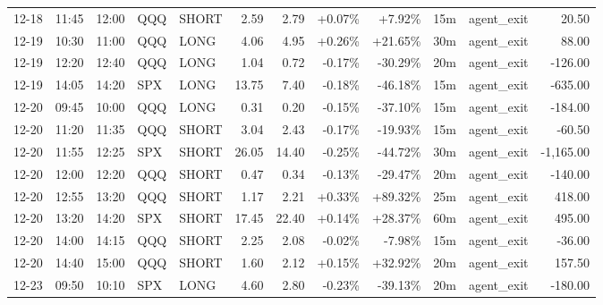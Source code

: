 \documentclass[11pt,a4paper]{article}
\begin{document}
\begin{center}
\begin{longtable}{>{\color{txtmain}}l l l l l r r r r r >{\color{txtmain}}l r}
12-18 & 11:45 & 12:00 & QQQ & SHORT & 2.59 & 2.79 & \textcolor{wingreen}{+0.07\%} & \textcolor{wingreen}{+7.92\%} & 15m & agent\_exit & \textcolor{wingreen}{20.50} \\
12-19 & 10:30 & 11:00 & QQQ & LONG & 4.06 & 4.95 & \textcolor{wingreen}{+0.26\%} & \textcolor{wingreen}{+21.65\%} & 30m & agent\_exit & \textcolor{wingreen}{88.00} \\
12-19 & 12:20 & 12:40 & QQQ & LONG & 1.04 & 0.72 & \textcolor{lossred}{-0.17\%} & \textcolor{lossred}{-30.29\%} & 20m & agent\_exit & \textcolor{lossred}{-126.00} \\
12-19 & 14:05 & 14:20 & SPX & LONG & 13.75 & 7.40 & \textcolor{lossred}{-0.18\%} & \textcolor{lossred}{-46.18\%} & 15m & agent\_exit & \textcolor{lossred}{-635.00} \\
12-20 & 09:45 & 10:00 & QQQ & LONG & 0.31 & 0.20 & \textcolor{lossred}{-0.15\%} & \textcolor{lossred}{-37.10\%} & 15m & agent\_exit & \textcolor{lossred}{-184.00} \\
12-20 & 11:20 & 11:35 & QQQ & SHORT & 3.04 & 2.43 & \textcolor{lossred}{-0.17\%} & \textcolor{lossred}{-19.93\%} & 15m & agent\_exit & \textcolor{lossred}{-60.50} \\
12-20 & 11:55 & 12:25 & SPX & SHORT & 26.05 & 14.40 & \textcolor{lossred}{-0.25\%} & \textcolor{lossred}{-44.72\%} & 30m & agent\_exit & \textcolor{lossred}{-1,165.00} \\
12-20 & 12:00 & 12:20 & QQQ & SHORT & 0.47 & 0.34 & \textcolor{lossred}{-0.13\%} & \textcolor{lossred}{-29.47\%} & 20m & agent\_exit & \textcolor{lossred}{-140.00} \\
12-20 & 12:55 & 13:20 & QQQ & SHORT & 1.17 & 2.21 & \textcolor{wingreen}{+0.33\%} & \textcolor{wingreen}{+89.32\%} & 25m & agent\_exit & \textcolor{wingreen}{418.00} \\
12-20 & 13:20 & 14:20 & SPX & SHORT & 17.45 & 22.40 & \textcolor{wingreen}{+0.14\%} & \textcolor{wingreen}{+28.37\%} & 60m & agent\_exit & \textcolor{wingreen}{495.00} \\
12-20 & 14:00 & 14:15 & QQQ & SHORT & 2.25 & 2.08 & \textcolor{lossred}{-0.02\%} & \textcolor{lossred}{-7.98\%} & 15m & agent\_exit & \textcolor{lossred}{-36.00} \\
12-20 & 14:40 & 15:00 & QQQ & SHORT & 1.60 & 2.12 & \textcolor{wingreen}{+0.15\%} & \textcolor{wingreen}{+32.92\%} & 20m & agent\_exit & \textcolor{wingreen}{157.50} \\
12-23 & 09:50 & 10:10 & SPX & LONG & 4.60 & 2.80 & \textcolor{lossred}{-0.23\%} & \textcolor{lossred}{-39.13\%} & 20m & agent\_exit & \textcolor{lossred}{-180.00} \\

\end{longtable}
\end{center}
\end{document}
